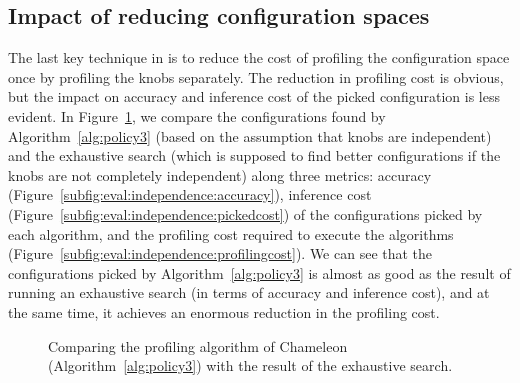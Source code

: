 \subsection{Impact of reducing configuration spaces}
\label{sec:eval:independence}

The last key technique in \name is to reduce the cost of profiling the configuration space once by profiling the knobs separately.
The reduction in profiling cost is obvious, but the impact on accuracy and inference cost of the picked configuration is less evident. 
In Figure~\ref{fig:eval:independence}, we compare the configurations found by Algorithm~\ref{alg:policy3} (based on the assumption that knobs are independent) and the exhaustive search (which is supposed to find better configurations if the knobs are not completely independent) along three metrics:
accuracy (Figure~\ref{subfig:eval:independence:accuracy}), inference cost  (Figure~\ref{subfig:eval:independence:pickedcost}) of the configurations picked by each algorithm, and the profiling cost required to execute the  algorithms
(Figure~\ref{subfig:eval:independence:profilingcost}).
We can see that the configurations picked by Algorithm~\ref{alg:policy3} is almost as good as the result of running an exhaustive search (in terms of accuracy and inference cost), and at the same time, it achieves an enormous reduction in the profiling cost.


\begin{figure}[t!]
    \centering
    \hspace{-0.5cm}
    \caption{Comparing the profiling algorithm of Chameleon (Algorithm~\ref{alg:policy3}) with the result of the exhaustive search.}
    \label{fig:eval:independence}
\end{figure}

